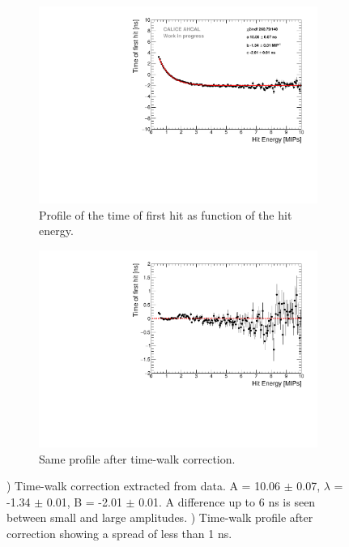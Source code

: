 \begin{figure}[htbp!]
	\begin{subfigure}[t]{0.5\textwidth}
		\centering
		\includegraphics[width=1\textwidth]{../Thesis_Plots/Timing/Muons/Plots/TimeWalkProfile.pdf}
		\caption{Profile of the time of first hit as function of the hit energy.}\label{fig:time_walk}
	\end{subfigure}
	\hfill
	\begin{subfigure}[t]{0.5\textwidth}
		\centering
		\includegraphics[width=1\textwidth]{../Thesis_Plots/Timing/Muons/Plots/TimeWalkProfile_Correction.pdf}
		\caption{Same profile after time-walk correction.}\label{fig:time_walk_corr}
	\end{subfigure}
	\caption{) Time-walk correction extracted from data. A = 10.06 $\pm$ 0.07, $\lambda$ = -1.34 $\pm$ 0.01, B = -2.01 $\pm$ 0.01. A difference up to 6 ns is seen between small and large amplitudes. ) Time-walk profile after correction showing a spread of less than 1 ns.}
\end{figure}

